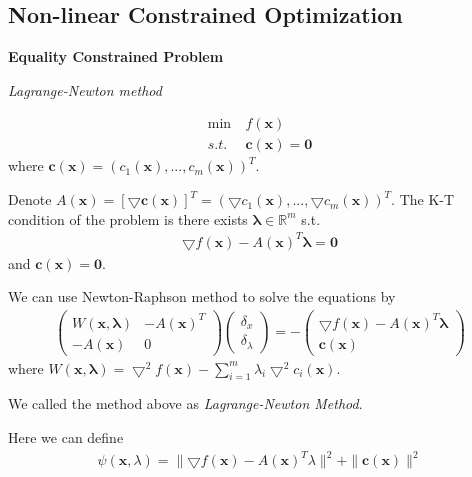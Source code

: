 \documentclass[runningheads]{llncs}
\begin{document}
\subsection{Non-linear Constrained Optimization}
\noindent\textbf{Equality Constrained Problem}
\par
\emph{Lagrange-Newton method}
\par
\begin{align}
    \min \ &f(\mathbf{x}) \\
    s.t. \ &\mathbf{c}(\mathbf{x}) = \mathbf{0}
\end{align}
where $\mathbf{c}(\mathbf{x}) = (c_1(\mathbf{x}),..., c_m(\mathbf{x}))^T$.
\par
Denote $A(\mathbf{x}) = [\bigtriangledown\mathbf{c}(\mathbf{x})]^T 
= (\bigtriangledown c_1(\mathbf{x}),..., \bigtriangledown c_m(\mathbf{x}))^T$.
The K-T condition of the problem is there exists
$\mathbf{\lambda} \in \mathbb{R}^m$ s.t.
\begin{align}
    \bigtriangledown f(\mathbf{x}) - A(\mathbf{x})^T \mathbf{\lambda} = \mathbf{0}
\end{align}
and $\mathbf{c}(\mathbf{x}) = \mathbf{0}$.
\par
We can use Newton-Raphson method to solve the equations by
\begin{align}
    \left(\begin{array}{ll}
        W(\mathbf{x}, \mathbf{\lambda}) & -A(\mathbf{x})^T \\
        -A(\mathbf{x}) & 0
    \end{array}\right)
    \left(\begin{array}{ll}
        \delta_{x} \\
        \delta_\lambda
    \end{array}\right) = -
    \left(
        \begin{array}{ll}
            \bigtriangledown f(\mathbf{x}) - A(\mathbf{x})^T \mathbf{\lambda} \\
            \mathbf{c}(\mathbf{x})
        \end{array}\right)
\end{align}
where $W(\mathbf{x}, \mathbf{\lambda}) = \bigtriangledown^2 f(\mathbf{x})
- \sum_{i=1}^m \lambda_i \bigtriangledown^2 c_i(\mathbf{x})$.
\par
We called the method above as \emph{Lagrange-Newton Method}.
\par
Here we can define 
\begin{align}
    \psi(\mathbf{x}, \lambda) = \parallel \bigtriangledown f(\mathbf{x})
    - A(\mathbf{x})^T\lambda \parallel^2 + \parallel\mathbf{c}(\mathbf{x})
    \parallel^2
\end{align}
\end{document}

